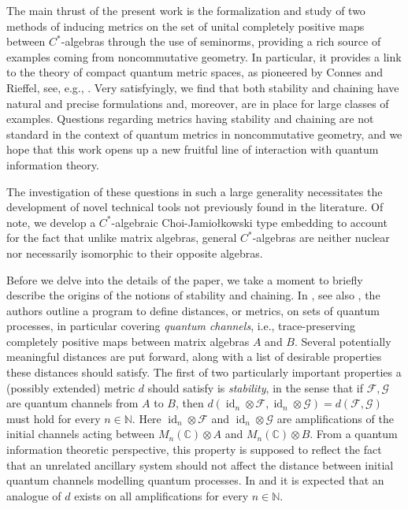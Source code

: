 \documentclass[11pt, a4paper, oneside, final, reqno]{amsart}
\newcommand{\bbN}{\mathbb{N}}
\newcommand{\bbC}{\mathbb{C}}
\newcommand{\id}{\operatorname{id}}
\theoremstyle{definition}
\theoremstyle{plain}
\theoremstyle{remark}
\numberwithin{equation}{section}
\begin{document}
The main thrust of the present work is the formalization and study of two methods of inducing metrics on the set of unital completely positive maps  between $C^*$-algebras through the use of seminorms, providing a rich source of examples coming from noncommutative geometry.  In particular, it provides a link to the theory of compact quantum metric spaces, as pioneered by Connes and Rieffel, see, e.g., \cite{Connes1989, Rieffel98, RieffelMetricsOnStateSpaces1999, Rieffel02, Rieffel2004}. Very satisfyingly, we find that both stability and chaining have natural and precise formulations and, moreover, are in place for large classes of examples. 
Questions regarding metrics having stability and chaining are not standard in the context of quantum metrics in noncommutative geometry, and we hope that this work opens up a new fruitful line of interaction with quantum information theory. 

The investigation of these questions in such a large generality necessitates the development of novel technical tools not previously found in the literature. Of note, we develop a $C^*$-algebraic Choi-Jamio\l{}kowski type embedding to account for the fact that unlike matrix algebras, general $C^*$-algebras are neither nuclear nor necessarily isomorphic to their opposite algebras.

Before we delve into the details of the paper, we take a moment to briefly describe the origins of the notions of stability and chaining. In \cite{Gilchrist},  see also \cite{BorovykVellambi25}, the authors outline a program to define distances, or metrics, on sets of quantum processes, in particular covering \emph{quantum channels}, i.e., trace-preserving completely positive maps between matrix algebras $A$ and $B$. Several potentially meaningful distances are put forward, along with a list of  desirable properties these distances should satisfy.  
The first of two particularly important properties a (possibly extended) metric $d$ should satisfy is \emph{stability}, in the sense that if $\mathcal{F}, \mathcal{G}$ are quantum channels from $A$ to $B$, then $d(\id_n \otimes \mathcal{F}, \id_n \otimes \mathcal{G}) = d(\mathcal{F},\mathcal{G})$ must hold for every $n \in \bbN$. Here $\id_n \otimes \mathcal{F}$ and $\id_n \otimes \mathcal{G}$ are amplifications of the initial channels acting between  $M_n(\bbC) \otimes A$ and $M_n(\bbC) \otimes B$. From a quantum information theoretic perspective, this property is supposed to reflect the fact that an unrelated ancillary system should not affect the distance between initial quantum channels modelling quantum processes.  In \cite{Gilchrist} and \cite{BorovykVellambi25} it is  expected that an analogue of $d$ exists on all amplifications  for every $n \in \bbN$.
\end{document}
